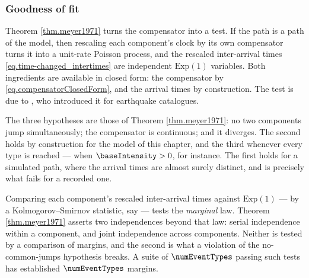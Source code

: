 \subsubsection{Goodness of fit}

Theorem \ref{thm.meyer1971} turns the compensator into a test.
If the path is a path of the model, then rescaling each component's clock by its own
compensator turns it into a unit-rate Poisson process,
and the rescaled inter-arrival times \eqref{eq.time-changed_intertimes} are independent
$\text{Exp}(1)$ variables.
Both ingredients are available in closed form:
the compensator by \eqref{eq.compensatorClosedForm},
and the arrival times by construction.
The test is due to \cite{Oga88sta}, who introduced it for earthquake catalogues.

The three hypotheses are those of Theorem \ref{thm.meyer1971}:
no two components jump simultaneously;
the compensator is continuous;
and it diverges.
The second holds by construction for the model of this chapter,
and the third whenever every type is reached --- when $\baseIntensity > 0$, for instance.
The first holds for a simulated path, where the arrival times are almost surely distinct,
and is precisely what fails for a recorded one.

\begin{remark}\label{remark.marginsOnly}
 Comparing each component's rescaled inter-arrival times against $\text{Exp}(1)$ ---
 by a Kolmogorov--Smirnov statistic, say --- tests the \emph{marginal} law.
 Theorem \ref{thm.meyer1971} asserts two independences beyond that law:
 serial independence within a component, and joint independence across components.
 Neither is tested by a comparison of margins,
 and the second is what a violation of the no-common-jumps hypothesis breaks.
 A suite of $\numEventTypes$ passing such tests has established $\numEventTypes$ margins.
\end{remark}
